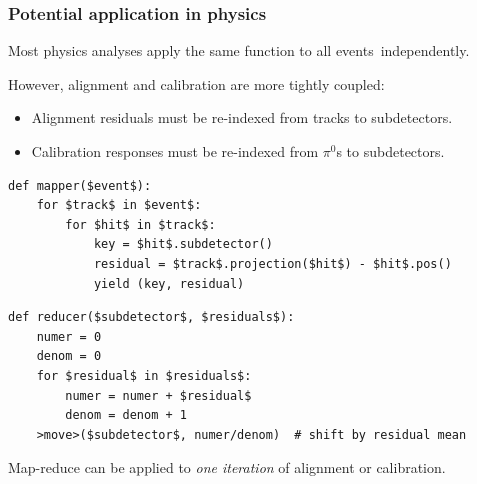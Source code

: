 \documentclass[compress]{beamer}
\begin{document}
\begin{frame}[fragile]
\frametitle{Potential application in physics}

Most physics analyses apply the same function to all \mbox{events independently.\hspace{-1 cm}}

However, alignment and calibration are more tightly coupled:
\begin{itemize}
\item Alignment residuals must be re-indexed from tracks to subdetectors.
\item Calibration responses must be re-indexed from $\pi^0$s to subdetectors.
\end{itemize}

\begin{lstlisting}[frame=single]
def mapper($event$):
    for $track$ in $event$:
        for $hit$ in $track$:
            key = $hit$.subdetector()
            residual = $track$.projection($hit$) - $hit$.pos()
            yield (key, residual)
\end{lstlisting}

\begin{lstlisting}[frame=single]
def reducer($subdetector$, $residuals$):
    numer = 0
    denom = 0
    for $residual$ in $residuals$:
        numer = numer + $residual$
        denom = denom + 1
    >move>($subdetector$, numer/denom)  # shift by residual mean
\end{lstlisting}

Map-reduce can be applied to {\it one iteration} of alignment or calibration.
\end{frame}
\end{document}

